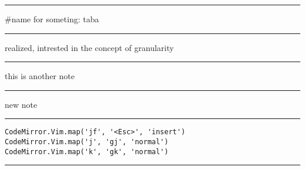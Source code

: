 \documentclass[letterpaper]{article}
\begin{document}
\noindent\rule{\textwidth}{0.5pt}

\#name for someting: taba

\noindent\rule{\textwidth}{0.5pt}

realized, intrested in the concept of granularity

\noindent\rule{\textwidth}{0.5pt}

this is another note

\noindent\rule{\textwidth}{0.5pt}

new note

\noindent\rule{\textwidth}{0.5pt}

\begin{verbatim}
CodeMirror.Vim.map('jf', '<Esc>', 'insert')
CodeMirror.Vim.map('j', 'gj', 'normal')
CodeMirror.Vim.map('k', 'gk', 'normal')
\end{verbatim}

\noindent\rule{\textwidth}{0.5pt}
\end{document}
